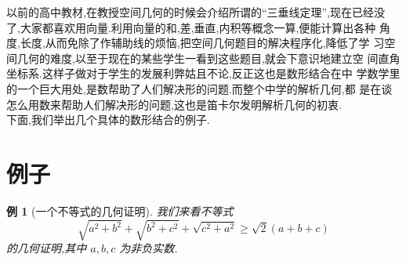 \documentclass[a4paper]{article}
\newtheorem{exam}{例}
\newenvironment{example}
{\bigskip\begin{mdframed}\begin{exam}}
    {\end{exam}\end{mdframed}\bigskip}
\begin{document}
以前的高中教材,在教授空间几何的时候会介绍所谓的“三垂线定理”,现在已经没
了,大家都喜欢用向量.利用向量的和,差,垂直,内积等概念一算,便能计算出各种
角度,长度,从而免除了作辅助线的烦恼,把空间几何题目的解决程序化,降低了学
习空间几何的难度,以至于现在的某些学生一看到这些题目,就会下意识地建立空
间直角坐标系.这样子做对于学生的发展利弊姑且不论,反正这也是数形结合在中
学数学里的一个巨大用处,是数帮助了人们解决形的问题.而整个中学的解析几何,都
是在谈怎么用数来帮助人们解决形的问题,这也是笛卡尔发明解析几何的初衷.\\


下面,我们举出几个具体的数形结合的例子.
\section{例子}
\begin{example}[一个不等式的几何证明]
我们来看不等式
\begin{equation}\label{eq:1}
\sqrt{a^2+b^2}+\sqrt{b^2+c^2}+\sqrt{c^2+a^2}\geq \sqrt{2}(a+b+c)
\end{equation}
的几何证明,其中 $a,b,c$ 为非负实数.
\end{example}
\end{document}
